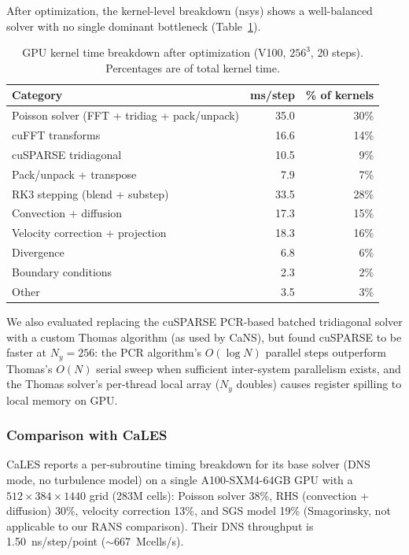 After optimization, the kernel-level breakdown (nsys) shows a well-balanced solver with no single dominant bottleneck (Table~\ref{tab:kernel_breakdown}).

\begin{table}[htbp]
\centering
\caption{GPU kernel time breakdown after optimization (V100, $256^3$, 20 steps). Percentages are of total kernel time.}
\label{tab:kernel_breakdown}
\begin{tabular}{lrr}
\toprule
Category & ms/step & \% of kernels \\
\midrule
Poisson solver (FFT + tridiag + pack/unpack) & 35.0 & 30\% \\
\quad cuFFT transforms                       & 16.6 & 14\% \\
\quad cuSPARSE tridiagonal                   & 10.5 & 9\% \\
\quad Pack/unpack + transpose                & 7.9  & 7\% \\
RK3 stepping (blend + substep)               & 33.5 & 28\% \\
Convection + diffusion                       & 17.3 & 15\% \\
Velocity correction + projection             & 18.3 & 16\% \\
Divergence                                   & 6.8  & 6\% \\
Boundary conditions                          & 2.3  & 2\% \\
Other                                        & 3.5  & 3\% \\
\bottomrule
\end{tabular}
\end{table}

We also evaluated replacing the cuSPARSE PCR-based batched tridiagonal solver with a custom Thomas algorithm (as used by CaNS), but found cuSPARSE to be faster at $N_y = 256$: the PCR algorithm's $O(\log N)$ parallel steps outperform Thomas's $O(N)$ serial sweep when sufficient inter-system parallelism exists, and the Thomas solver's per-thread local array ($N_y$ doubles) causes register spilling to local memory on GPU.

\subsubsection{Comparison with CaLES}

CaLES \citep{Xiao2024} reports a per-subroutine timing breakdown for its base solver (DNS mode, no turbulence model) on a single A100-SXM4-64GB GPU with a $512 \times 384 \times 1440$ grid (283M cells):
Poisson solver 38\%, RHS (convection + diffusion) 30\%, velocity correction 13\%, and SGS model 19\% (Smagorinsky, not applicable to our RANS comparison).
Their DNS throughput is 1.50~ns/step/point ($\sim$667~Mcells/s).


